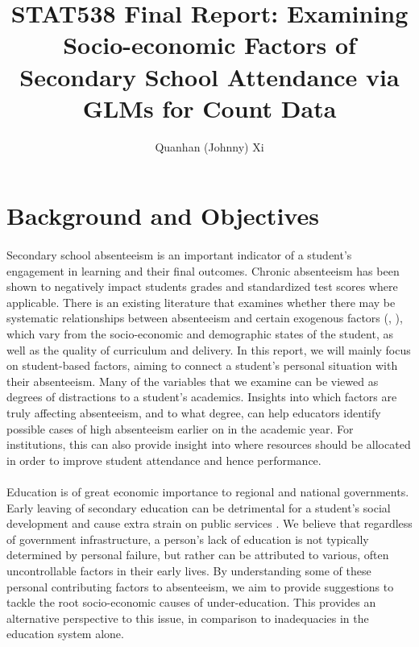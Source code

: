 \documentclass[12pt, titlepage]{article}
\author{Quanhan (Johnny) Xi}
\title{STAT538 Final Report: Examining Socio-economic Factors of Secondary School Attendance via GLMs for Count Data}
\begin{document}
	\maketitle
	\section{Background and Objectives}
	\paragraph{} Secondary school absenteeism is an important indicator of a student's engagement in learning and their final outcomes. Chronic absenteeism has been shown to negatively impact students grades and standardized test scores where applicable. There is an existing literature that examines whether there may be systematic relationships between absenteeism and certain exogenous factors (\cite{Currie::2009}, \cite{Gubbels::2019}), which vary from the socio-economic and demographic states of the student, as well as the quality of curriculum and delivery. In this report, we will mainly focus on student-based factors, aiming to connect a student's personal situation with their absenteeism. Many of the variables that we examine can be viewed as degrees of distractions to a student's academics. Insights into which factors are truly affecting absenteeism, and to what degree, can help educators identify possible cases of high absenteeism earlier on in the academic year. For institutions, this can also provide insight into where resources should be allocated in order to improve student attendance and hence performance. 
	
	\paragraph{} Education is of great economic importance to regional and national governments. Early leaving of secondary education can be detrimental for a student's social development and cause extra strain on public services \cite{Rocque::2016}. We believe that regardless of government infrastructure, a person's lack of education is not typically determined by personal failure, but rather can be attributed to various, often uncontrollable factors in their early lives. By understanding some of these personal contributing factors to absenteeism, we aim to provide suggestions to tackle the root socio-economic causes of under-education. This provides an alternative perspective to this issue, in comparison to inadequacies in the education system alone. 
	
\end{document}
